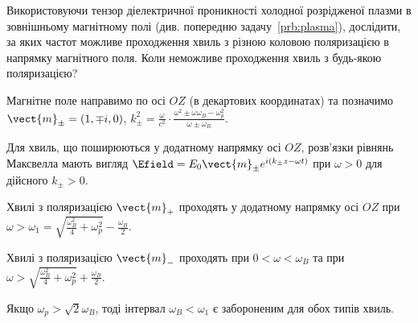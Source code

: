 \begin{problem}
    Використовуючи тензор діелектричної проникності холодної розрідженої плазми в зовнішньому магнітному полі (див.  попередню задачу~\ref{prb:plasma}), дослідити, за яких частот можливе проходження хвиль з різною коловою поляризацією в напрямку магнітного поля. Коли неможливе проходження хвиль з будь-якою поляризацією?
\begin{solution}
    Магнітне поле направимо по осі $OZ$ (в декартових координатах) та позначимо \(\vect{m}_{\pm} = (1, \mp i,0)\), \(k_\pm^2 = \frac{\omega }{c^2} \cdot \frac{\omega^2 \pm \omega \omega_B - \omega_p^2}{\omega  \pm \omega_B}\).
    
    Для хвиль, що поширюються у додатному напрямку осі $OZ$, розв’язки рівнянь Максвелла мають вигляд $\Efield = E_0\vect{m}_{\pm} e^{i(k_\pm z - \omega t)}$ при $\omega > 0$ для дійсного $k_{\pm} >0$.
    
    Хвилі з поляризацією $\vect{m}_+$ проходять у додатному напрямку осі $OZ$ при \(\omega  > \omega_1 = \sqrt {\frac{{\omega_B^2}}{4} + \omega_p^2}  - \frac{\omega _B}{2}\).
    
    Хвилі з поляризацією $\vect{m}_-$ проходять при \(0<\omega<\omega_B\)  та при\\\(\omega  > \sqrt {\frac{\omega_B^2}{4} + \omega_p^2}  + \frac{\omega _B}{2}\).

    Якщо \({\omega _p} > \sqrt 2 {\omega _B}\), тоді  інтервал \(\omega_B  <  \omega_1 \)  є забороненим для обох типів хвиль.
\end{solution}
\end{problem}

